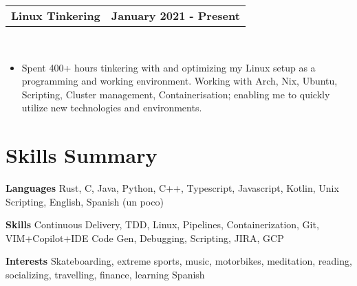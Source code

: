\documentclass[letterpaper,oneside,10.8pt]{article}
\makeatletter
\newcommand{\titleAndDate}[2]{
  \small{
  \vspace{-1pt}
    \begin{tabular*}{1\textwidth}{l@{\extracolsep{\fill}}r}
      \textbf{#1} & \textbf{#2} \\
    \end{tabular*}\vspace{-1pt} \\
  }
}
\newcommand{\normalText}[1]{
  \small{
    {#1}
  }\vspace{-1pt}\\
}
\makeatother
\begin{document}
\vspace{4pt}

\titleAndDate{Linux Tinkering}{January 2021 - Present}
\begin{itemize}[leftmargin=10pt]
    \item\normalText{Spent 400+ hours tinkering with and optimizing my Linux setup as a programming and working environment. Working with Arch, Nix, Ubuntu, Scripting, Cluster management, Containerisation; enabling me to quickly utilize new technologies and environments. }
\end{itemize}

\section{Skills Summary}

\normalText{\textbf{Languages} Rust, C, Java, Python, C++, Typescript, Javascript, Kotlin, Unix Scripting, English, Spanish (un poco)}
\vspace{3pt}
\normalText{\textbf{Skills} Continuous Delivery, TDD, Linux, Pipelines, Containerization, Git, VIM+Copilot+IDE Code Gen, Debugging, Scripting, JIRA, GCP}
\vspace{3pt}
\normalText{\textbf{Interests} Skateboarding, extreme sports, music, 
 motorbikes, meditation, reading, socializing, travelling, finance, learning Spanish}

\end{document}
